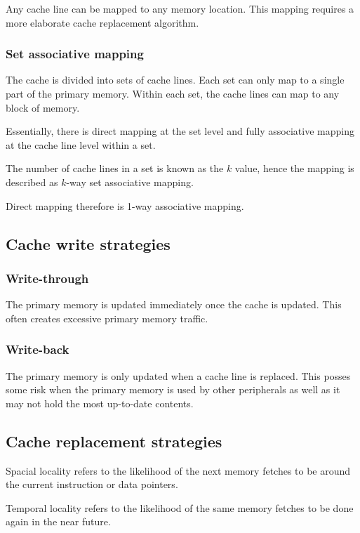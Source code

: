 \documentclass{report}
\begin{document}
Any cache line can be mapped to any memory location. This mapping requires a
more elaborate cache replacement algorithm.

\subsubsection{Set associative mapping}

The cache is divided into sets of cache lines. Each set can only map to a single
part of the primary memory. Within each set, the cache lines can map to any
block of memory.

Essentially, there is direct mapping at the set level and fully associative
mapping at the cache line level within a set.

The number of cache lines in a set is known as the $k$ value, hence the mapping
is described as $k$-way set associative mapping.

Direct mapping therefore is 1-way associative mapping.

\subsection{Cache write strategies}

\subsubsection{Write-through}

The primary memory is updated immediately once the cache is updated. This often
creates excessive primary memory traffic.

\subsubsection{Write-back}

The primary memory is only updated when a cache line is replaced. This posses
some risk when the primary memory is used by other peripherals as well as it may
not hold the most up-to-date contents.

\subsection{Cache replacement strategies}

Spacial locality refers to the likelihood of the next memory fetches to be
around the current instruction or data pointers.

Temporal locality refers to the likelihood of the same memory fetches to be done
again in the near future.
\end{document}
